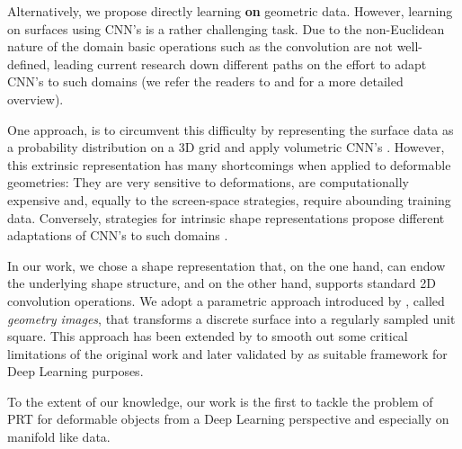 Alternatively, we propose directly learning \textbf{on} geometric data.  However, learning on surfaces using CNN's is a rather challenging task. Due to the non-Euclidean nature of the domain basic operations such as the convolution are not well-defined, leading current research down different paths on the effort to adapt CNN's to such domains (we refer the readers to \cite{Geometric_deep_learning} and \cite{DeepGeoCourse} for a more detailed overview).

One approach, is to circumvent this difficulty by representing the surface data as a probability distribution on a  3D grid and apply volumetric CNN's \cite{3d_ShapeNets}. However, this extrinsic representation has many shortcomings when applied to deformable geometries: They are very sensitive to deformations, are computationally expensive and, equally to the screen-space strategies, require abounding training data. Conversely, strategies for intrinsic shape representations propose different adaptations of CNN's to such domains \cite{ShapeNet1, BoscainiMRB16, CNN_on_Torus}.

In our work, we chose a shape representation that, on the one hand, can endow the underlying shape structure, and on the other hand, supports standard 2D convolution operations. We adopt a parametric approach introduced by \cite{gu2002geometry}, called \textit{geometry images}, that transforms a discrete surface into a regularly sampled unit square. This approach has been extended by \cite{Spherical_Parametrization} to smooth out some critical limitations of the original work and later validated by \cite{sinha2016deep} as suitable framework for Deep Learning purposes.

To the extent of our knowledge, our work is the first to tackle the problem of PRT for deformable objects from a Deep Learning perspective and especially on manifold like data. 


